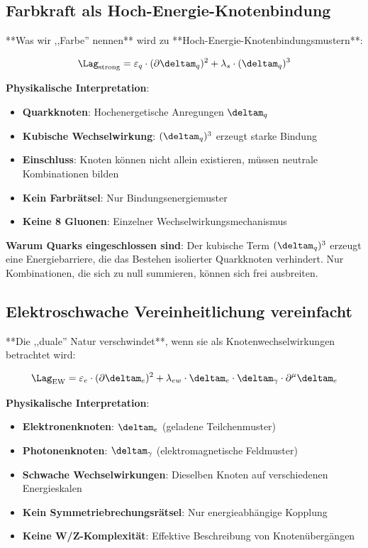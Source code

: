 	\subsection{Farbkraft als Hoch-Energie-Knotenbindung}
	
	**Was wir ,,Farbe'' nennen** wird zu **Hoch-Energie-Knotenbindungsmustern**:
	
	\begin{equation}
		\Lag_{\text{strong}} = \varepsilon_q \cdot (\partial \deltam_q)^2 + \lambda_s \cdot (\deltam_q)^3
	\end{equation}
	
	\textbf{Physikalische Interpretation}:
	\begin{itemize}
		\item \textbf{Quarkknoten}: Hochenergetische Anregungen $\deltam_q$ 
		\item \textbf{Kubische Wechselwirkung}: $(\deltam_q)^3$ erzeugt starke Bindung
		\item \textbf{Einschluss}: Knoten können nicht allein existieren, müssen neutrale Kombinationen bilden
		\item \textbf{Kein Farbrätsel}: Nur Bindungsenergiemuster
		\item \textbf{Keine 8 Gluonen}: Einzelner Wechselwirkungsmechanismus
	\end{itemize}
	
	\textbf{Warum Quarks eingeschlossen sind}:
	Der kubische Term $(\deltam_q)^3$ erzeugt eine Energiebarriere, die das Bestehen isolierter Quarkknoten verhindert. Nur Kombinationen, die sich zu null summieren, können sich frei ausbreiten.
	
	\subsection{Elektroschwache Vereinheitlichung vereinfacht}
	
	**Die ,,duale'' Natur verschwindet**, wenn sie als Knotenwechselwirkungen betrachtet wird:
	
	\begin{equation}
		\Lag_{\text{EW}} = \varepsilon_e \cdot (\partial \deltam_e)^2 + \lambda_{ew} \cdot \deltam_e \cdot \deltam_\gamma \cdot \partial^\mu \deltam_e
	\end{equation}
	
	\textbf{Physikalische Interpretation}:
	\begin{itemize}
		\item \textbf{Elektronenknoten}: $\deltam_e$ (geladene Teilchenmuster)
		\item \textbf{Photonenknoten}: $\deltam_\gamma$ (elektromagnetische Feldmuster)
		\item \textbf{Schwache Wechselwirkungen}: Dieselben Knoten auf verschiedenen Energieskalen
		\item \textbf{Kein Symmetriebrechungsrätsel}: Nur energieabhängige Kopplung
		\item \textbf{Keine W/Z-Komplexität}: Effektive Beschreibung von Knotenübergängen
	\end{itemize}
	
